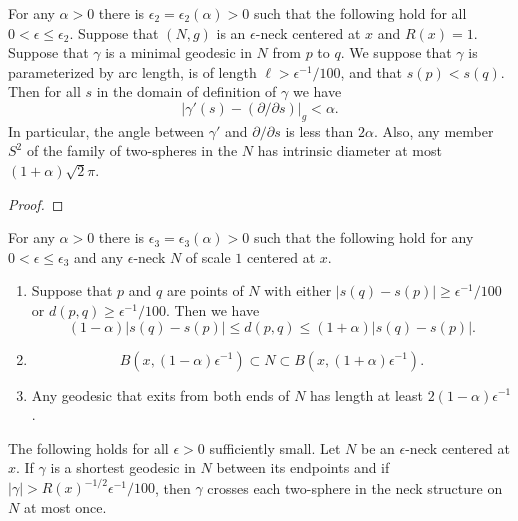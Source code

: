 \begin{lemma}
\label{lem:neck-geodesic-directions}
\label{directions}

 For any $\alpha>0$  there is $\epsilon_2=\epsilon_2(\alpha)>0$
such that the following hold for all $0<\epsilon\le \epsilon_2$.
Suppose that $(N,g)$ is an $\epsilon$-neck centered at $x$ and
$R(x)=1$. Suppose that $\gamma$ is a minimal geodesic in  $N$ from
$p$ to $q$. We suppose that $\gamma$ is parameterized by arc length,
is of length $\ell>\epsilon^{-1}/100$, and that $s(p)<s(q)$. Then
for all $s$ in the domain of definition of $\gamma$ we have
$$|\gamma'(s)-(\partial/\partial s)|_g<\alpha.$$
 In particular, the angle between $\gamma'$ and $\partial/\partial
s$ is less than $2\alpha$.
 Also,  any
member $S^2$ of the family of two-spheres in the $N$ has intrinsic
diameter at most $(1+\alpha)\sqrt{2}\pi$.
\end{lemma}

\begin{proof}
\sketch
\end{proof}


\begin{corollary}
\label{cor:neck-distance-estimates}
\label{neckgeo}

For any $\alpha>0$ there is $\epsilon_3=\epsilon_3(\alpha)>0$ such
that the  following hold for any $0<\epsilon\le \epsilon_3$ and any
$\epsilon$-neck $N$ of scale $1$ centered at $x$.
\begin{enumerate}
\item[(1)] Suppose that $p$ and $q$ are points of  $N$
with either $|s(q)-s(p)|\ge \epsilon^{-1}/100$ or $d(p,q)\ge
\epsilon^{-1}/100$. Then  we have
$$(1-\alpha)|s(q)-s(p)|\le d(p,q)\le (1+\alpha)|s(q)-s(p)|.$$
\item[(2)]
$$B(x,(1-\alpha)\epsilon^{-1})\subset
N\subset B(x,(1+\alpha)\epsilon^{-1}).$$
\item[(3)] Any geodesic that exits from both ends of $N$ has length at least $2(1-\alpha)
\epsilon^{-1}$.\end{enumerate}
\end{corollary}



\begin{corollary}
\label{cor:shortest-geodesic-crosses-neck-once}
\label{compint}

The following holds for all $\epsilon>0$ sufficiently small. Let $N$
be an $\epsilon$-neck centered at $x$. If $\gamma$ is a shortest
geodesic in $N$ between its endpoints and if
$|\gamma|>R(x)^{-1/2}\epsilon^{-1}/100$, then $\gamma$ crosses each
two-sphere in the neck structure on $N$ at most once.
\end{corollary}






